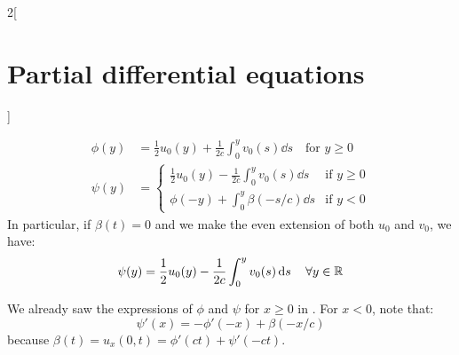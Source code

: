\documentclass[../../../main_math.tex]{subfiles}
\begin{document}
\begin{multicols}{2}[\section{Partial differential equations}]
\begin{proposition}
    \begin{align*}
      \phi(y) & =\frac{1}{2}u_0(y)+\frac{1}{2c}\int_0^yv_0(s)\dd{s}\quad\text{for }y\geq 0 \\
      \psi(y) & =
      \begin{cases}
        \displaystyle\frac{1}{2}u_0(y)-\frac{1}{2c}\int_0^yv_0(s)\dd{s} & \text{if } y\geq 0 \\
        \displaystyle\phi(-y)+\int_0^y\beta(-s/c)\dd{s}                 & \text{if } y< 0
      \end{cases}
    \end{align*}
    In particular, if $\beta(t)=0$ and we make the even extension of both $u_0$ and $v_0$, we have:
    \begin{equation*}
      \psi(y) =\frac{1}{2}u_0(y)-\frac{1}{2c}\int_0^yv_0(s)\dd{s} \quad\forall y\in\mathbb{R}
    \end{equation*}
  \end{proposition}
  \begin{sproof}
    We already saw the expressions of $\phi$ and $\psi$ for $x\geq 0$ in . For $x<0$, note that: $$\psi'(x)=-\phi'(-x)+\beta(-x/c)$$ because $\beta(t)=u_x(0,t)=\phi'(ct)+\psi'(-ct)$.
  \end{sproof}

\end{multicols}
\end{document}

